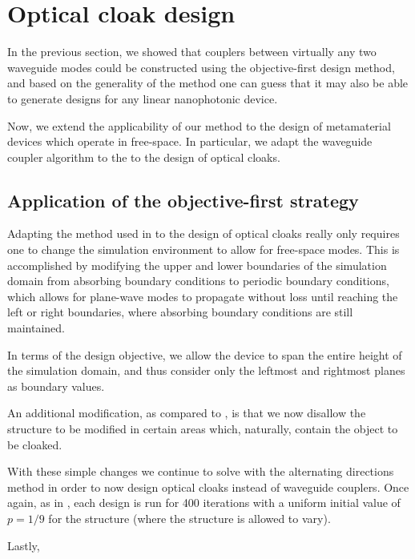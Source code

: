 \section{Optical cloak design}
In the previous section,
    we showed that couplers between virtually any two waveguide modes
    could be constructed using the objective-first design method,
    and based on the generality of the method
    one can guess that it may also be
    able to generate designs for any linear nanophotonic device.

Now, we extend the applicability of our method
    to the design of metamaterial devices which operate in free-space.
In particular,
    we adapt the waveguide coupler algorithm to the 
    to the design of optical cloaks.

\subsection{Application of the objective-first strategy}
Adapting the method used in  to the design of optical cloaks
    really only requires one to change the simulation environment
    to allow for free-space modes.
This is accomplished by modifying the upper and lower boundaries
    of the simulation domain from absorbing boundary conditions
    to periodic boundary conditions,
    which allows for plane-wave modes to propagate without loss
    until reaching the left or right boundaries,
    where absorbing boundary conditions are still maintained.

In terms of the design objective, 
    we allow the device to span the entire height of the simulation domain,
    and thus consider only the leftmost and rightmost planes as boundary values.

An additional modification, as compared to , is that
    we now disallow the structure to be modified in certain areas
    which, naturally, contain the object to be cloaked.

With these simple changes we continue to solve 
    with the alternating directions method
    in order to now design optical cloaks
    instead of waveguide couplers.
Once again, as in , each design is run for 400 iterations
    with a uniform initial value of $p = 1/9$ for the structure
    (where the structure is allowed to vary).

Lastly, 


